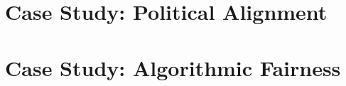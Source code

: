 




\part{Case Study: Political Alignment}






\part{Case Study: Algorithmic Fairness}






\backmatter






